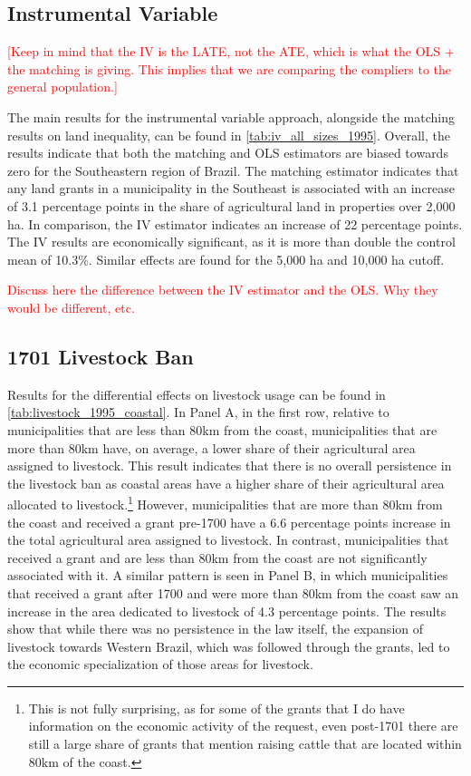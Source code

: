 \documentclass[11pt]{article}
\newcommand{\red}[1]{\textcolor{red}{#1}}
\begin{document}

\subsection{Instrumental Variable}

\red{[Keep in mind that the IV is the LATE, not the ATE, which is what the OLS + the matching is giving. This implies that we are comparing the compliers to the general population.]}

The main results for the instrumental variable approach, alongside the matching results on land inequality, can be found in \autoref{tab:iv_all_sizes_1995}.
Overall, the results indicate that both the matching and OLS estimators are biased towards zero for the Southeastern region of Brazil.
The matching estimator indicates that any land grants in a municipality in the Southeast is associated with an increase of 3.1 percentage points in the share of agricultural land in properties over 2,000 ha. 
In comparison, the IV estimator indicates an increase of 22 percentage points. 
The IV results are economically significant, as it is more than double the control mean of 10.3\%.
Similar effects are found for the 5,000 ha and 10,000 ha cutoff. 

\red{Discuss here the difference between the IV estimator and the OLS. Why they would be different, etc.}

\subsection{1701 Livestock Ban}

Results for the differential effects on livestock usage can be found in \autoref{tab:livestock_1995_coastal}. 
In Panel A, in the first row, relative to municipalities that are less than 80km from the coast, municipalities that are more than 80km have, on average, a lower share of their agricultural area assigned to livestock.
This result indicates that there is no overall persistence in the livestock ban as coastal areas have a higher share of their agricultural area allocated to livestock.\footnote{This is not fully surprising, as for some of the grants that I do have information on the economic activity of the request, even post-1701 there are still a large share of grants that mention raising cattle that are located within 80km of the coast.}
However, municipalities that are more than 80km from the coast and received a grant pre-1700 have a 6.6 percentage points increase in the total agricultural area assigned to livestock.
In contrast, municipalities that received a grant and are less than 80km from the coast are not significantly associated with it.
A similar pattern is seen in Panel B, in which municipalities that received a grant after 1700 and were more than 80km from the coast saw an increase in the area dedicated to livestock of 4.3 percentage points. 
The results show that while there was no persistence in the law itself, the expansion of livestock towards Western Brazil, which was followed through the grants, led to the economic specialization of those areas for livestock.
\end{document}

